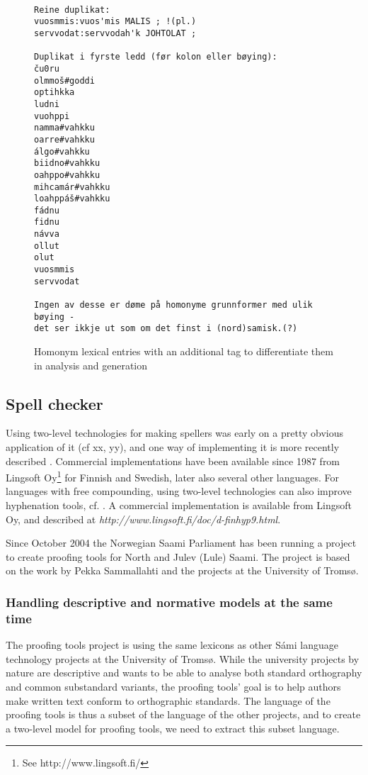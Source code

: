 \documentclass[a4paper,english]{article}
\begin{document}
\begin{figure}[htb]
\caption{Homonym lexical entries with an additional tag to differentiate them in analysis and generation}
\begin{center}
\begin{verbatim}

Reine duplikat:
vuosmmis:vuos'mis MALIS ; !(pl.)
servvodat:servvodah'k JOHTOLAT ;

Duplikat i fyrste ledd (før kolon eller bøying):
ču0ru
olmmoš#goddi
optihkka
ludni
vuohppi
namma#vahkku
oarre#vahkku
álgo#vahkku
biidno#vahkku
oahppo#vahkku
mihcamár#vahkku
loahppáš#vahkku
fádnu
fidnu
návva
ollut
olut
vuosmmis
servvodat

Ingen av desse er døme på homonyme grunnformer med ulik bøying -
det ser ikkje ut som om det finst i (nord)samisk.(?)
\end{verbatim}
\end{center}
\label{homonlex}
\end{figure}

\subsection{Spell checker}\label{spell}

Using two-level technologies for making spellers was early on a pretty obvious application of it (cf xx, yy), and one way of implementing it is more recently described \cite{Beesley03}. Commercial implementations have been available since 1987 from Lingsoft Oy\footnote{See http://www.lingsoft.fi/} for Finnish and Swedish, later also several other languages. For languages with free compounding, using two-level technologies can also improve hyphenation tools, cf. \cite{Karlsson85}. A commercial implementation is available from Lingsoft Oy, and described at \textit{http://www.lingsoft.fi/doc/d-finhyp9.html}.

Since October 2004 the Norwegian Saami Parliament has been running a project to create proofing tools for North and Julev (Lule) Saami. The project is based on the work by Pekka Sammallahti and the projects at the University of Tromsø.

\subsubsection{Handling descriptive and normative models at the same time}


The proofing tools project is using the same lexicons as other Sámi language technology projects at the University of Tromsø. While the university projects by nature are descriptive and wants to be able to analyse both standard orthography and common substandard variants, the proofing tools' goal is to help authors make written text conform to orthographic standards. The language of the proofing tools is thus a subset of the language of the other projects, and to create a two-level model for proofing tools, we need to extract this subset language.
\end{document}
